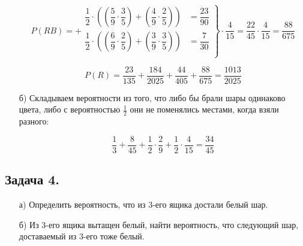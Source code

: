 \begin{enumerate}
	 \[
	 P(RB) = +
	 	\left.
		 	\begin{array}{cc}
			 	\dfrac{1}{2} \cdot \left( \left( \dfrac{5}{9} \cdot \dfrac{3}{5} \right) + \left( \dfrac{4}{9} \cdot \dfrac{2}{5} \right) \right) & = \dfrac{23}{90} \\
			 	\dfrac{1}{2} \cdot \left( \left( \dfrac{6}{9} \cdot \dfrac{2}{5} \right) + \left( \dfrac{3}{9} \cdot \dfrac{3}{5} \right) \right) & = \dfrac{7}{30} \\
		 	\end{array}
		 	\right\}
	 	\cdot \dfrac{4}{15} = \dfrac{22}{45} \cdot \dfrac{4}{15}  = \dfrac{88}{675}
	 \]
	 
	 \[ P(R) = \dfrac{23}{135} + \dfrac{184}{2025} + \dfrac{44}{405} + \dfrac{88}{675} = \dfrac{1013}{2025} \]
	 
	 \item[б)] Складываем вероятности из того, что либо бы брали шары одинаково цвета, либо с вероятностью $\frac{1}{2}$ они не поменялись местами, когда взяли разного:
	 
	 \[ \dfrac{1}{3} + \dfrac{8}{45} + \dfrac{1}{2} \cdot \dfrac{2}{9} + \dfrac{1}{2} \cdot \dfrac{4}{15} = \dfrac{34}{45} \]
\end{enumerate}

\newpage










\subsection*{Задача 4.}

\begin{figure}[H]
\end{figure}

\begin{enumerate}
	\item [а)] Определить вероятность, что из 3-его ящика достали белый шар.
	\item [б)] Из 3-его ящика вытащен белый, найти вероятность, что следующий шар, доставаемый из 3-его тоже белый.
\end{enumerate}

